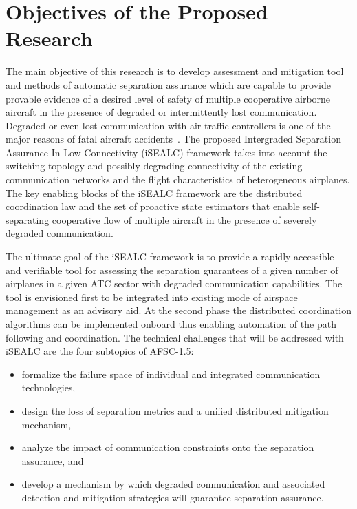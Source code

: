 \documentclass[letter,onecolumn,12pt]{aiaa-tc}
\newcommand{\1}{1_n}
\begin{document}
\section{Objectives of the Proposed Research}

The main objective of this research is to develop assessment and mitigation tool and methods of automatic separation assurance which are capable to provide provable evidence of a desired level of safety of multiple cooperative airborne aircraft in the presence of degraded or intermittently lost communication. Degraded or even lost communication with air traffic controllers is one of the major reasons of fatal aircraft accidents~\cite{Kochenderfer_2012}. The proposed  Intergraded Separation Assurance In Low-Connectivity (iSEALC) framework takes into account the switching topology and possibly degrading connectivity of the existing communication networks and the flight characteristics of heterogeneous airplanes. The key enabling blocks of the iSEALC framework are the distributed coordination law and the set of proactive state estimators that enable self-separating cooperative flow of multiple aircraft in the presence of severely degraded communication.

The ultimate goal of the iSEALC framework is to provide a rapidly accessible and verifiable tool for assessing the separation guarantees of a given number of airplanes in a given ATC sector with degraded communication capabilities.  The tool is  envisioned first to be integrated into existing mode of airspace management as an advisory aid. At the second phase the distributed coordination algorithms can be implemented onboard thus enabling automation of the path following and coordination. The technical challenges that will be addressed with iSEALC are the four subtopics of AFSC-1.5:
\vspace{-2mm}
\begin{itemize}
\setlength{\itemsep}{-4pt}
    \item formalize the failure space of individual and integrated communication technologies,
    \item design the loss of separation metrics and a unified distributed mitigation mechanism,
    \item analyze the impact of  communication constraints onto the separation assurance, and
    \item develop a mechanism by which degraded communication and associated detection and mitigation strategies will guarantee separation assurance.
\end{itemize}
\vspace{-2mm}
\end{document}
